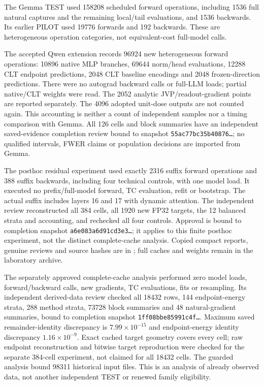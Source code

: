 The Gemma TEST used 158208 scheduled forward operations, including 1536 full natural captures and the remaining local/tail evaluations, and 1536 backwards. Its earlier PILOT used 19776 forwards and 192 backwards. These are heterogeneous operation categories, not equivalent-cost full-model calls.

The accepted Qwen extension records  96924 new heterogeneous forward operations: 10896 native MLP branches, 69644 norm/head evaluations, 12288 CLT endpoint predictions, 2048 CLT baseline encodings and 2048 frozen-direction predictions. There were no autograd backward calls or full-LLM loads; partial native/CLT weights were read. The 2052 analytic JVP/readout-gradient points are reported separately. The 4096 adopted unit-dose outputs are not counted again. This accounting is neither a count of independent samples nor a timing comparison with Gemma. All 126 cells and block summaries have an independent saved-evidence completion review bound to snapshot \texttt{55ac77bc35b40876\ldots}; no qualified intervals, FWER claims or population decisions are imported from Gemma.


The posthoc residual experiment used exactly 2316 suffix forward operations and 388 suffix backwards, including four technical controls, with one model load. It executed no prefix/full-model forward, TC evaluation, refit or bootstrap. The actual suffix includes layers 16 and 17 with dynamic attention. The independent review reconstructed all 384 cells, all 1920 new FP32 targets, the 12 balanced strata and accounting, and rechecked all four controls. Approval is bound to completion snapshot \texttt{a6e083a6d91cd3e3\ldots}; it applies to this finite posthoc experiment, not the distinct complete-cache analysis. Copied compact reports, genuine reviews and source hashes are in ; full caches and weights remain in the laboratory archive.

The separately approved complete-cache analysis performed zero model loads, forward/backward calls, new gradients, TC evaluations, fits or resampling. Its independent derived-data review checked all 18432 rows, 144 endpoint-energy strata, 288 method strata, 73728 block summaries and 48 natural-gradient summaries, bound to completion snapshot \texttt{1ff08bbe85991c4f\ldots}. Maximum saved remainder-identity discrepancy is $7.99\times10^{-15}$ and endpoint-energy identity discrepancy $1.16\times10^{-9}$. Exact cached target geometry covers every cell; raw endpoint reconstruction and bitwise target reproduction were checked for the separate 384-cell experiment, not claimed for all 18432 cells. The guarded analysis bound 98311 historical input files. This is an analysis of already observed data, not another independent TEST or renewed family eligibility.

